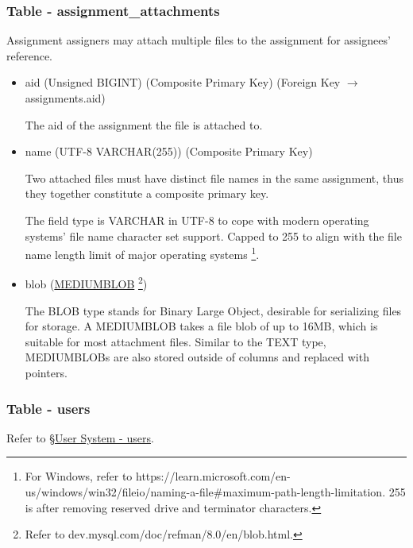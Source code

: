\documentclass[12pt]{report}
\newcommand{\n}{\par}
\begin{document}
\subsubsection{Table - assignment\_attachments} \label{data-layer.design.assignment-system.assignment_attachments}
Assignment assigners may attach multiple files to the assignment for assignees' reference.
\begin{itemize}
	\item aid (Unsigned BIGINT) (Composite Primary Key) (Foreign Key $\rightarrow$ assignments.aid)\n
	      The aid of the assignment the file is attached to.
	\item name (UTF-8 VARCHAR(255)) (Composite Primary Key)\n
	      Two attached files must have distinct file names in the same assignment,
	      thus they together constitute a composite primary key.\n
	      The field type is VARCHAR in UTF-8 to cope with modern operating systems' file name character set support.
	      Capped to 255 to align with the file name length limit of major operating systems
	      \footnote{For Windows, refer to https://learn.microsoft.com/en-us/windows/win32/fileio/naming-a-file\#maximum-path-length-limitation.
		      255 is after removing reserved drive and terminator characters.}.
	\item blob (\href{https://dev.mysql.com/doc/refman/8.0/en/blob.html}{MEDIUMBLOB}
	      \footnote{Refer to dev.mysql.com/doc/refman/8.0/en/blob.html.})\n
	      The BLOB type stands for Binary Large Object, desirable for serializing files for storage.
	      A MEDIUMBLOB takes a file blob of up to 16MB, which is suitable for most attachment files.
	      Similar to the TEXT type, MEDIUMBLOBs are also stored outside of columns and replaced with pointers.
\end{itemize}

\subsubsection{Table - users} \label{data-layer.design.assignment-system.users}
Refer to \S \hyperref[data-layer.design.user-system.users]{User System - users}.
\end{document}
